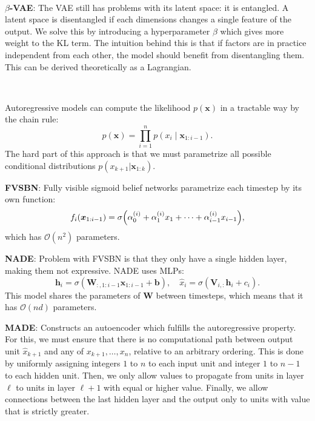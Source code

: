 \documentclass{article}
\newcommand{\lft}{\mathopen{}\mathclose\bgroup\left}
\newcommand{\rgt}{\aftergroup\egroup\right}
\renewcommand{\vec}[1]{\bm{#1}}
\newcommand{\mat}[1]{\bm{#1}}
\newenvironment{topic}[1]
{\textbf{\sffamily \colorbox{black}{\rlap{\textbf{\textcolor{white}{#1}}}\hspace{\linewidth}\hspace{-2\fboxsep}}} \\ \vspace{0.2cm}}
{}
\begin{document}
\begin{multicols*}{2}
\begin{topic}{Autoencoders}
        \textbf{$\beta$-VAE}: The VAE still has problems with its latent space: it is entangled. A
        latent space is disentangled if each dimensions changes a single feature of the output. We
        solve this by introducing a hyperparameter $\beta$ which gives more weight to the KL term. The
        intuition behind this is that if factors are in practice independent from each other, the
        model should benefit from disentangling them. This can be derived theoretically as a
        Lagrangian.

    \end{topic}

    \begin{topic}{Autoregressive models}

        Autoregressive models can compute the likelihood $p(\vec{x})$ in a tractable way by the chain rule: \[
            p(\vec{x}) = \prod_{i=1}^n p(x_i \mid \vec{x}_{1:i-1}).
        \]
        The hard part of this approach is that we must parametrize all possible conditional distributions
        $p(x_{k+1} | \vec{x}_{1:k})$.

        \textbf{FVSBN}: Fully visible sigmoid belief networks parametrize each timestep by its own function: \[
            f_i(\vec{x}_{1:i-1}) = \sigma \lft( \alpha_0^{(i)} + \alpha_1^{(i)} x_1 + \cdots + \alpha_{i-1}^{(i)} x_{i-1} \rgt),
        \]
        which has $\mathcal{O}(n^2)$ parameters.

        \textbf{NADE}: Problem with FVSBN is that they only have a single hidden layer, making them
        not expressive. NADE uses MLPs: \[
            \vec{h}_i = \sigma(\mat{W}_{:,1:i-1} \vec{x}_{1:i-1} + \vec{b}), \quad \hat{x}_i = \sigma(\mat{V}_{i,:} \vec{h}_i + c_i).
        \]
        This model shares the parameters of $\mat{W}$ between timesteps, which means that it has
        $\mathcal{O}(nd)$ parameters.

        \textbf{MADE}: Constructs an autoencoder which fulfills the autoregressive property. For this,
        we must ensure that there is no computational path between output unit $\hat{x}_{k+1}$ and
        any of $x_{k+1}, \ldots, x_n$, relative to an
        arbitrary ordering. This is done by uniformly assigning integers $1$ to $n$ to each input
        unit and integer $1$ to $n-1$ to each hidden unit. Then, we only allow values to propagate
        from units in layer $\ell$ to units in layer $\ell+1$ with equal or higher value. Finally,
        we allow connections between the last hidden layer and the output only to units with value
        that is strictly greater.


\end{topic}
\end{multicols*}
\end{document}
